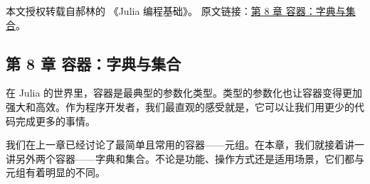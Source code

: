 
本文授权转载自郝林的 《Julia 编程基础》。 原文链接：\href{https://github.com/hyper0x/JuliaBasics/blob/master/book/ch08.md}{第 8 章 容器：字典与集合}。


\subsection{第 8 章 容器：字典与集合}

在 Julia 的世界里，容器是最典型的参数化类型。类型的参数化也让容器变得更加强大和高效。作为程序开发者，我们最直观的感受就是，它可以让我们用更少的代码完成更多的事情。

我们在上一章已经讨论了最简单且常用的容器——元组。在本章，我们就接着讲一讲另外两个容器——字典和集合。不论是功能、操作方式还是适用场景，它们都与元组有着明显的不同。
